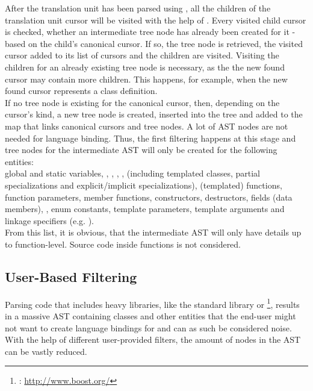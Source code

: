 After the translation unit has been parsed using , all the children of the translation unit cursor will be visited with the help of \linebreak{}. Every visited child cursor is checked, whether an intermediate tree node has already been created for it - based on the child's canonical cursor. If so, the tree node is retrieved, the visited cursor added to its list of cursors and the children are visited. Visiting the children for an already existing tree node is necessary, as the the new found cursor may contain more children. This happens, for example, when the new found cursor represents a class definition.\\
If no tree node is existing for the canonical cursor, then, depending on the cursor's kind, a new tree node is created, inserted into the tree and added to the map that links canonical cursors and tree nodes. A lot of AST nodes are not needed for language binding. Thus, the first filtering happens at this stage and tree nodes for the intermediate AST will only be created for the following  entities:\\global and static variables, , , , ,  (including templated classes, partial specializations and explicit/implicit specializations), (templated) functions, function parameters, member functions, constructors, destructors, fields (data members), , enum constants, template parameters, template arguments and linkage specifiers (e.g. ).\\
From this list, it is obvious, that the intermediate AST will only have details up to function-level. Source code inside functions is not considered. 

\subsection{User-Based Filtering}

Parsing code that includes heavy libraries, like the  standard library or \footnote{: \url{http://www.boost.org/}}, results in a massive AST containing classes and other entities that the end-user might not want to create language bindings for and can as such be considered noise. With the help of different user-provided filters, the amount of nodes in the AST can be vastly reduced. 


